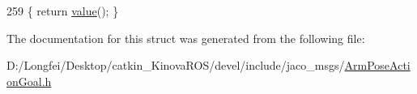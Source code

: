 \begin{DoxyCode}
259 \{ \textcolor{keywordflow}{return} \hyperlink{structros_1_1message__traits_1_1Definition_3_01_1_1jaco__msgs_1_1ArmPoseActionGoal___3_01ContainerAllocator_01_4_01_4_a13776284e15a80a54e710c6713fb82b4}{value}(); \}
\end{DoxyCode}


The documentation for this struct was generated from the following file\+:\begin{DoxyCompactItemize}
\item 
D\+:/\+Longfei/\+Desktop/catkin\+\_\+\+Kinova\+R\+O\+S/devel/include/jaco\+\_\+msgs/\hyperlink{ArmPoseActionGoal_8h}{Arm\+Pose\+Action\+Goal.\+h}\end{DoxyCompactItemize}
